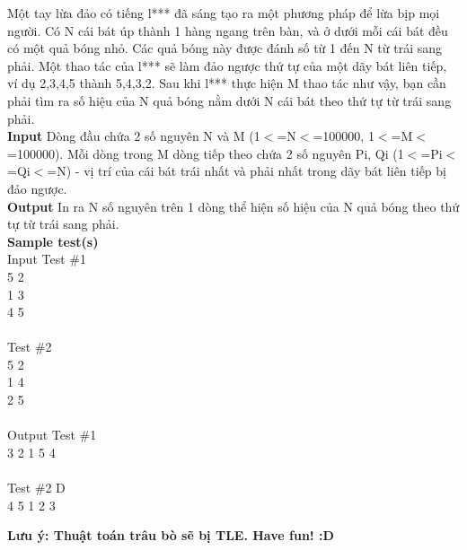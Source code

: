 





     Một tay lừa đảo có tiếng l*** đã sáng tạo ra một phương pháp để lừa bịp mọi người. Có N cái bát úp thành 1 hàng ngang trên bàn, và ở dưới mỗi cái bát đều có một quả bóng nhỏ. Các quả bóng này được đánh số từ 1 đến N từ trái sang phải. Một thao tác của l*** sẽ làm đảo ngược thứ tự của một dãy bát liên tiếp, ví dụ 2,3,4,5 thành 5,4,3,2. Sau khi l*** thực hiện M thao tác như vậy, bạn cần phải tìm ra số hiệu của N quả bóng nằm dưới N cái bát theo thứ tự từ trái sang phải.       
\\\textbf{    Input   }       Dòng đầu chứa 2 số nguyên N và M (1$<$=N$<$=100000,  1$<$=M$<$=100000). Mỗi dòng trong M dòng tiếp theo chứa 2 số nguyên Pi, Qi (1$<$=Pi$<$=Qi$<$=N) - vị trí của cái bát trái nhất và phải nhất trong dãy bát liên tiếp bị đảo ngược.       
\\\textbf{    Output   }       In ra N số nguyên trên 1 dòng thể hiện số hiệu của N quả bóng theo thứ tự từ trái sang phải.       
\\\textbf{    Sample test(s)   }
\\   Input           Test \#1    
\\    5 2    
\\    1 3    
\\    4 5    
\\
\\    Test \#2    
\\    5 2    
\\    1 4    
\\    2 5    
\\
\\   Output           Test \#1    
\\    3 2 1 5 4    
\\
\\    Test \#2 D    
\\    4 5 1 2 3   

\textbf{    Lưu ý: Thuật toán trâu bò sẽ bị TLE. Have fun! :D    
\\}

